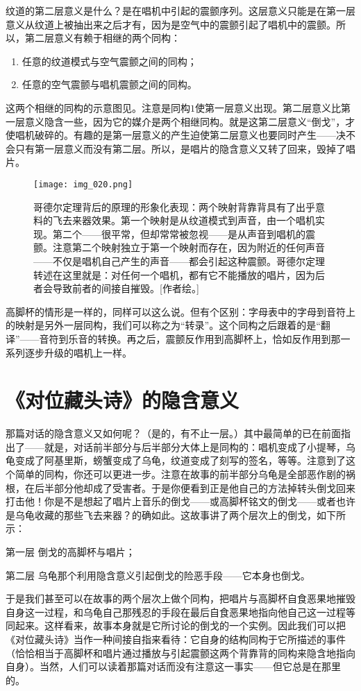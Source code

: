 纹道的第二层意义是什么？是在唱机中引起的震颤序列。这层意义只能是在第一层意义从纹道上被抽出来之后才有，因为是空气中的震颤引起了唱机中的震颤。所以，第二层意义有赖于相继的两个同构：
\begin{enumerate}
\item 任意的纹道模式与空气震颤之间的同构；
\item 任意的空气震颤与唱机震颤之间的同构。
\end{enumerate}
这两个相继的同构的示意图见。注意是同构$1$使第一层意义出现。第二层意义比第一层意义隐含一些，因为它的媒介是两个相继同构。就是这第二层意义“倒戈”，才使唱机破碎的。有趣的是第一层意义的产生迫使第二层意义也要同时产生——决不会只有第一层意义而没有第二层。所以，是唱片的隐含意义又转了回来，毁掉了唱片。

\begin{figure}
\texttt{[image: img\_020.png]}
\caption[哥德尔定理背后的原理的形象化表现。]
  {哥德尔定理背后的原理的形象化表现：两个映射背靠背具有了出乎意料的飞去来器效果。第一个映射是从纹道模式到声音，由一个唱机实现。第二个——很平常，但却常常被忽视——是从声音到唱机的震颤。注意第二个映射独立于第一个映射而存在，因为附近的任何声音——不仅是唱机自己产生的声音——都会引起这种震颤。哥德尔定理转述在这里就是：对任何一个唱机，都有它不能播放的唱片，因为后者会导致前者的间接自摧毁。[作者绘。]}
\end{figure}

高脚杯的情形是一样的，同样可以这么说。但有个区别：字母表中的字母到音符上的映射是另外一层同构，我们可以称之为“转录”。这个同构之后跟着的是“翻译”——音符到乐音的转换。再之后，震颤反作用到高脚杯上，恰如反作用到那一系列逐步升级的唱机上一样。

\section{《对位藏头诗》的隐含意义}

那篇对话的隐含意义又如何呢？（是的，有不止一层。）其中最简单的已在前面指出了——就是，对话前半部分与后半部分大体上是同构的：唱机变成了小提琴，乌龟变成了阿基里斯，螃蟹变成了乌龟，纹道变成了刻写的签名，等等。注意到了这个简单的同构，你还可以更进一步。注意在故事的前半部分乌龟是全部恶作剧的祸根，在后半部分他却成了受害者。于是你便看到正是他自己的方法掉转头倒戈回来打击他！你是不是想起了唱片上音乐的倒戈——或高脚杯铭文的倒戈——或者也许是乌龟收藏的那些飞去来器？的确如此。这故事讲了两个层次上的倒戈，如下所示：
\begin{thm}{第一层}
倒戈的高脚杯与唱片；
\end{thm}
\begin{thm}{第二层}
乌龟那个利用隐含意义引起倒戈的险恶手段——它本身也倒戈。
\end{thm}
于是我们甚至可以在故事的两个层次上做个同构，把唱片与高脚杯自食恶果地摧毁自身这一过程，和乌龟自己那残忍的手段在最后自食恶果地指向他自己这一过程等同起来。这样看来，故事本身就是它所讨论的倒戈的一个实例。因此我们可以把《对位藏头诗》当作一种间接自指来看待：它自身的结构同构于它所描述的事件（恰恰相当于高脚杯和唱片通过播放与引起震颤这两个背靠背的同构来隐含地指向自身）。当然，人们可以读着那篇对话而没有注意这一事实——但它总是在那里的。


